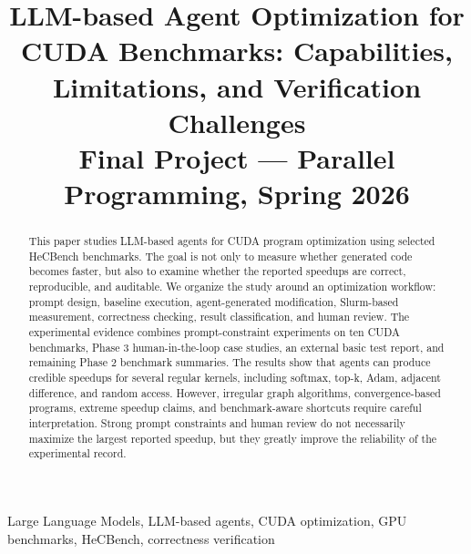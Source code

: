 \documentclass[conference]{IEEEtran}
\begin{document}
\title{LLM-based Agent Optimization for CUDA Benchmarks: Capabilities, Limitations, and Verification Challenges\\
{\footnotesize Final Project --- Parallel Programming, Spring 2026}}

\author{%
\and
{}
\and
{}
}

\maketitle

\begin{abstract}
This paper studies LLM-based agents for CUDA program optimization using selected HeCBench benchmarks. The goal is not only to measure whether generated code becomes faster, but also to examine whether the reported speedups are correct, reproducible, and auditable. We organize the study around an optimization workflow: prompt design, baseline execution, agent-generated modification, Slurm-based measurement, correctness checking, result classification, and human review. The experimental evidence combines prompt-constraint experiments on ten CUDA benchmarks, Phase 3 human-in-the-loop case studies, an external basic test report, and remaining Phase 2 benchmark summaries. The results show that agents can produce credible speedups for several regular kernels, including softmax, top-k, Adam, adjacent difference, and random access. However, irregular graph algorithms, convergence-based programs, extreme speedup claims, and benchmark-aware shortcuts require careful interpretation. Strong prompt constraints and human review do not necessarily maximize the largest reported speedup, but they greatly improve the reliability of the experimental record.
\end{abstract}

\begin{IEEEkeywords}
Large Language Models, LLM-based agents, CUDA optimization, GPU benchmarks, HeCBench, correctness verification
\end{IEEEkeywords}
\end{document}
